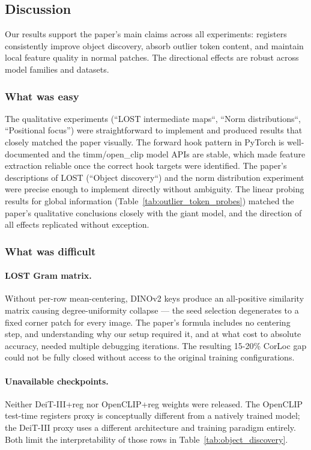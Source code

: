 \subsection{Discussion}
Our results support the paper's main claims across all experiments: registers consistently improve object discovery, absorb outlier token content, and maintain local feature quality in normal patches. The directional effects are robust across model families and datasets.

\subsubsection{What was easy}
The qualitative experiments (``LOST intermediate maps``, ``Norm distributions``, ``Positional focus'') were straightforward to implement and produced results that closely matched the paper visually. The forward hook pattern in PyTorch is well-documented and the timm/open\_clip model APIs are stable, which made feature extraction reliable once the correct hook targets were identified. The paper's descriptions of LOST (``Object discovery``) and the norm distribution experiment were precise enough to implement directly without ambiguity. The linear probing results for global information (Table~\ref{tab:outlier_token_probes}) matched the paper's qualitative conclusions closely with the giant model, and the direction of all effects replicated without exception.

\subsubsection{What was difficult}
\paragraph{LOST Gram matrix.} 
\label{sec:LOST_gram_matrix}
Without per-row mean-centering, DINOv2 keys produce an all-positive similarity matrix causing degree-uniformity collapse — the seed selection degenerates to a fixed corner patch for every image. The paper's formula includes no centering step, and understanding why our setup required it, and at what cost to absolute accuracy, needed multiple debugging iterations. The resulting 15-20\% CorLoc gap could not be fully closed without access to the original training configurations.
\paragraph{Unavailable checkpoints.} Neither DeiT-III+reg nor OpenCLIP+reg weights were released. The OpenCLIP test-time registers proxy \citep{jiang2025vision} is conceptually different from a natively trained model; the DeiT-III proxy uses a different architecture and training paradigm entirely. Both limit the interpretability of those rows in Table~\ref{tab:object_discovery}.
